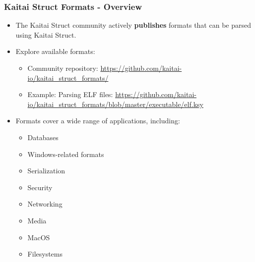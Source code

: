 \begin{frame}
\frametitle{Kaitai Struct Formats - Overview}

\begin{itemize}
    \item The Kaitai Struct community actively \textbf{publishes} formats that can be parsed using Kaitai Struct.
    \item Explore available formats:
          \begin{itemize}
              \item Community repository: \url{https://github.com/kaitai-io/kaitai_struct_formats/}
              \item Example: Parsing ELF files:
                    \url{https://github.com/kaitai-io/kaitai_struct_formats/blob/master/executable/elf.ksy}
          \end{itemize}
    \item Formats cover a wide range of applications, including:
          \begin{itemize}
              \item Databases
              \item Windows-related formats
              \item Serialization
              \item Security
              \item Networking
              \item Media
              \item MacOS
              \item Filesystems
          \end{itemize}
\end{itemize}

\end{frame}

